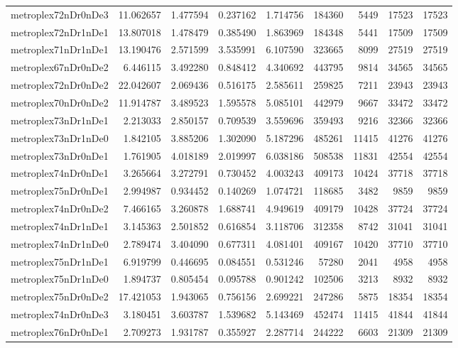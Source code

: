 \documentclass[../../../thesis.tex]{subfiles}
\begin{document}
\begin{longtable}{|l|r|r|r|r|r|r|r|r|}
metroplex72nDr0nDe3 & 11.062657 & 1.477594 & 0.237162 & 1.714756 & 184360 & 5449 & 17523 & 17523 \\
metroplex72nDr1nDe1 & 13.807018 & 1.478479 & 0.385490 & 1.863969 & 184348 & 5441 & 17509 & 17509 \\
metroplex71nDr1nDe1 & 13.190476 & 2.571599 & 3.535991 & 6.107590 & 323665 & 8099 & 27519 & 27519 \\
metroplex67nDr0nDe2 & 6.446115 & 3.492280 & 0.848412 & 4.340692 & 443795 & 9814 & 34565 & 34565 \\
metroplex72nDr0nDe2 & 22.042607 & 2.069436 & 0.516175 & 2.585611 & 259825 & 7211 & 23943 & 23943 \\
metroplex70nDr0nDe2 & 11.914787 & 3.489523 & 1.595578 & 5.085101 & 442979 & 9667 & 33472 & 33472 \\
metroplex73nDr1nDe1 & 2.213033 & 2.850157 & 0.709539 & 3.559696 & 359493 & 9216 & 32366 & 32366 \\
metroplex73nDr1nDe0 & 1.842105 & 3.885206 & 1.302090 & 5.187296 & 485261 & 11415 & 41276 & 41276 \\
metroplex73nDr0nDe1 & 1.761905 & 4.018189 & 2.019997 & 6.038186 & 508538 & 11831 & 42554 & 42554 \\
metroplex74nDr0nDe1 & 3.265664 & 3.272791 & 0.730452 & 4.003243 & 409173 & 10424 & 37718 & 37718 \\
metroplex75nDr0nDe1 & 2.994987 & 0.934452 & 0.140269 & 1.074721 & 118685 & 3482 & 9859 & 9859 \\
metroplex74nDr0nDe2 & 7.466165 & 3.260878 & 1.688741 & 4.949619 & 409179 & 10428 & 37724 & 37724 \\
metroplex74nDr1nDe1 & 3.145363 & 2.501852 & 0.616854 & 3.118706 & 312358 & 8742 & 31041 & 31041 \\
metroplex74nDr1nDe0 & 2.789474 & 3.404090 & 0.677311 & 4.081401 & 409167 & 10420 & 37710 & 37710 \\
metroplex75nDr1nDe1 & 6.919799 & 0.446695 & 0.084551 & 0.531246 & 57280 & 2041 & 4958 & 4958 \\
metroplex75nDr1nDe0 & 1.894737 & 0.805454 & 0.095788 & 0.901242 & 102506 & 3213 & 8932 & 8932 \\
metroplex75nDr0nDe2 & 17.421053 & 1.943065 & 0.756156 & 2.699221 & 247286 & 5875 & 18354 & 18354 \\
metroplex74nDr0nDe3 & 3.180451 & 3.603787 & 1.539682 & 5.143469 & 452474 & 11415 & 41844 & 41844 \\
metroplex76nDr0nDe1 & 2.709273 & 1.931787 & 0.355927 & 2.287714 & 244222 & 6603 & 21309 & 21309 \\

\end{longtable}
\end{document}
